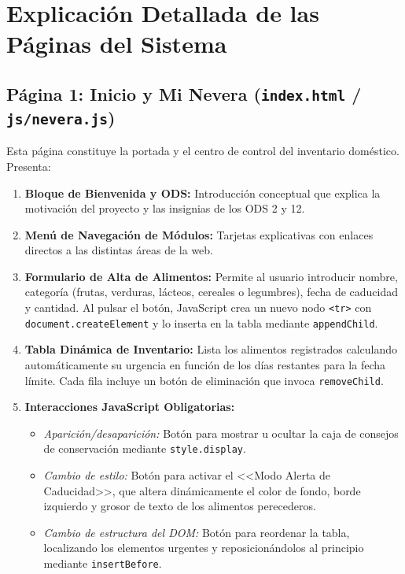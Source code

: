 \documentclass[11pt,a4paper]{article}
\begin{document}
\newpage

\section{Explicación Detallada de las Páginas del Sistema}

\subsection{Página 1: Inicio y Mi Nevera (\texttt{index.html} / \texttt{js/nevera.js})}
Esta página constituye la portada y el centro de control del inventario doméstico. Presenta:
\begin{enumerate}
    \item \textbf{Bloque de Bienvenida y ODS:} Introducción conceptual que explica la motivación del proyecto y las insignias de los ODS 2 y 12.
    \item \textbf{Menú de Navegación de Módulos:} Tarjetas explicativas con enlaces directos a las distintas áreas de la web.
    \item \textbf{Formulario de Alta de Alimentos:} Permite al usuario introducir nombre, categoría (frutas, verduras, lácteos, cereales o legumbres), fecha de caducidad y cantidad. Al pulsar el botón, JavaScript crea un nuevo nodo \texttt{<tr>} con \texttt{document.createElement} y lo inserta en la tabla mediante \texttt{appendChild}.
    \item \textbf{Tabla Dinámica de Inventario:} Lista los alimentos registrados calculando automáticamente su urgencia en función de los días restantes para la fecha límite. Cada fila incluye un botón de eliminación que invoca \texttt{removeChild}.
    \item \textbf{Interacciones JavaScript Obligatorias:}
    \begin{itemize}
        \item \textit{Aparición/desaparición:} Botón para mostrar u ocultar la caja de consejos de conservación mediante \texttt{style.display}.
        \item \textit{Cambio de estilo:} Botón para activar el <<Modo Alerta de Caducidad>>, que altera dinámicamente el color de fondo, borde izquierdo y grosor de texto de los alimentos perecederos.
        \item \textit{Cambio de estructura del DOM:} Botón para reordenar la tabla, localizando los elementos urgentes y reposicionándolos al principio mediante \texttt{insertBefore}.
    \end{itemize}
\end{enumerate}
\end{document}
